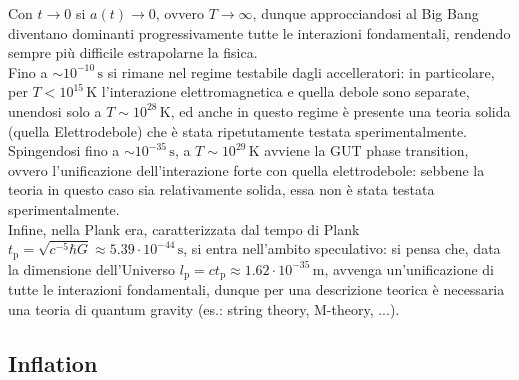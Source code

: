 Con $ t \rightarrow 0 $ si $ a(t) \rightarrow 0 $, ovvero $ T \rightarrow \infty $, dunque approcciandosi al Big Bang diventano dominanti progressivamente tutte le interazioni fondamentali, rendendo sempre più difficile estrapolarne la fisica.\\
Fino a $ \sim 10^{-10} \,\text{s} $ si rimane nel regime testabile dagli accelleratori: in particolare, per $ T < 10^{15} \,\text{K} $ l'interazione elettromagnetica e quella debole sono separate, unendosi solo a $ T \sim 10^{28} \,\text{K} $, ed anche in questo regime è presente una teoria solida (quella Elettrodebole) che è stata ripetutamente testata sperimentalmente.\\
Spingendosi fino a $ \sim 10^{-35} \,\text{s} $, a $ T \sim 10^{29} \,\text{K} $ avviene la GUT phase transition, ovvero l'unificazione dell'interazione forte con quella elettrodebole: sebbene la teoria in questo caso sia relativamente solida, essa non è stata testata sperimentalmente.\\
Infine, nella Plank era, caratterizzata dal tempo di Plank $ t_\text{p} = \sqrt{c^{-5} \hbar G} \approx 5.39 \cdot 10^{-44} \,\text{s} $, si entra nell'ambito speculativo: si pensa che, data la dimensione dell'Universo $ l_\text{p} = c t_\text{p} \approx 1.62 \cdot 10^{-35} \,\text{m} $, avvenga un'unificazione di tutte le interazioni fondamentali, dunque per una descrizione teorica è necessaria una teoria di quantum gravity (es.: string theory, M-theory, ...).

\subsection{Inflation}

